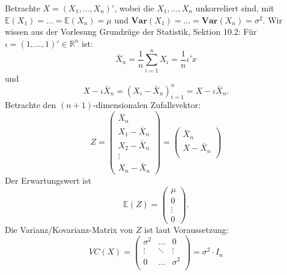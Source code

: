 \documentclass[10pt]{article}
\newcommand{\FZV}{X_1, \ldots, X_n} %
\newcommand{\IR}{\mathbb{R}} %
\newcommand{\EW}{\mathbb{E}} %
\newcommand{\Var}{\textbf{Var}} %
\newcommand{\sni}{\sum_{i=1}^{n}} %
\newenvironment{BSP}[1][]
{\begin{Beispiel}[frametitle=#1]}{\end{Beispiel}}
\begin{document}
			\begin{BSP}[Beispiel 3.0.1 (komponentenweise Unkorreliertheit)]
				Betrachte $X = (\FZV)'$, wobei die $\FZV$ unkorreliert sind, mit $\EW(X_1) = \ldots = \EW(X_n) = \mu$ und $\Var(X_1) = \ldots = \Var(X_n) = \sigma^2$. 
				Wir wissen aus der Vorlesung Grundzüge der Statistik, Sektion 10.2:
				Für $\iota = (1,\ldots,1)' \in \IR^n$ ist:
				\begin{equation*}
					\bar{X}_n = \frac{1}{n} \sni X_i = \frac{1}{n} \iota' x
				\end{equation*}
				und 
				\begin{equation*}
					X-\iota\bar{X}_n = (X_i - \bar{X}_n)^n_{i=1} = X - \iota \bar{X}_n.
				\end{equation*}
				Betrachte den $(n+1)$-dimensionalen Zufallsvektor:
				\begin{equation*}
					Z = \left(
					\begin{array}{c}
						\bar{X}_n\\
						X_1 - \bar{X}_n\\
						X_2 - \bar{X}_n\\
						\vdots\\
						X_n - \bar{X}_n
					\end{array}
					\right) = \left(
					\begin{array}{c}
						\bar{X}_n\\
						X - \bar{X}_n\\
					\end{array}
					\right)
				\end{equation*}
				Der Erwartungswert ist
				\begin{equation*}
					\EW(Z) = \left(
					\begin{array}{c}
						\mu\\
						0\\
						\vdots\\
						0
					\end{array}
					\right).
				\end{equation*}
				Die Varianz/Kovarianz-Matrix von $Z$ ist laut Voraussetzung:
				\begin{equation*}
					VC(X) = \begin{pmatrix}
						\sigma^2 & \ldots & 0\\
						\vdots & \ddots & \vdots\\
						0 & \ldots & \sigma^2\\
					\end{pmatrix} = \sigma^2 \cdot I_n
				\end{equation*}

\end{BSP}
\end{document}
